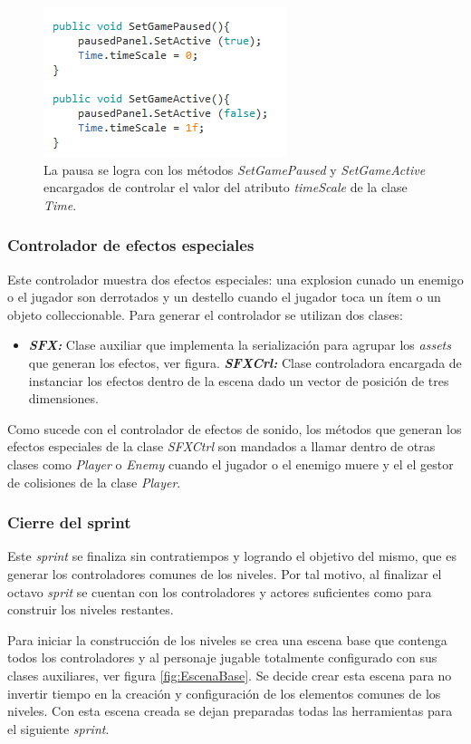 \begin{figure}[h]
		\centering
		\includegraphics[height=0.2 \textheight]{03TrabajoRealizado/imagenes/Paused.png}
		\caption{La pausa se logra con los métodos \textit{SetGamePaused} y 
		\textit{SetGameActive} encargados de controlar el valor del atributo 
		\textit{timeScale} de la clase \textit{Time}.}
		\label{fig:pauseMethods}
	\end{figure} 
	
\subsubsection{Controlador de efectos especiales}
Este controlador muestra dos efectos especiales: una explosion cunado un enemigo o el jugador son derrotados y un destello cuando el jugador toca un ítem o un objeto colleccionable. Para generar el controlador se utilizan dos clases:

\begin{itemize}
	\item \textit{\textbf{SFX:}} Clase auxiliar que implementa la serialización para agrupar los \textit{assets} que generan los efectos, ver figura.
	\textit{\textbf{SFXCrl:}} Clase controladora encargada de instanciar los efectos dentro de la escena dado un vector de posición de tres dimensiones.
\end{itemize}

Como sucede con el controlador de efectos de sonido, los métodos que generan los efectos especiales de la clase \textit{SFXCtrl} son mandados a llamar dentro de otras clases como \textit{Player} o \textit{Enemy} cuando el jugador o el enemigo muere y el el gestor de colisiones de la clase \textit{Player}.

\subsubsection{Cierre del sprint}
Este \textit{sprint} se finaliza sin contratiempos y logrando el objetivo del 
mismo, que es generar los controladores comunes de los niveles. Por tal motivo, al 
finalizar el octavo \textit{sprit} se cuentan con los controladores y actores 
suficientes como para construir los niveles restantes. 
\\
\par
Para iniciar la construcción de los niveles se crea una escena base que contenga 
todos los controladores y al personaje jugable totalmente configurado con sus 
clases auxiliares, ver figura \ref{fig:EscenaBase}. Se decide crear esta escena 
para no invertir tiempo en la creación y configuración de los elementos comunes 
de los niveles. Con esta escena creada se dejan preparadas todas las herramientas 
para el siguiente \textit{sprint}.

